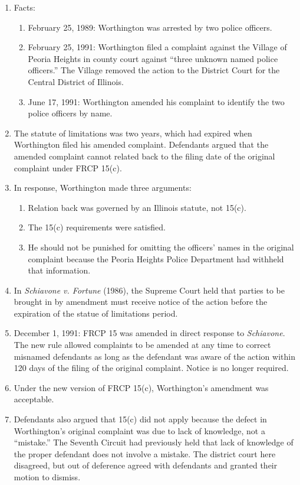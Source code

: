 \begin{enumerate}
    \item Facts:
    \begin{enumerate}
        \item February 25, 1989: Worthington was arrested by two police 
        officers.
        \item February 25, 1991: Worthington filed a complaint against the 
        Village of Peoria Heights in county court against ``three unknown 
        named police officers.'' The Village removed the action to the 
        District Court for the Central District of Illinois.
        \item June 17, 1991: Worthington amended his complaint to identify the 
        two police officers by name.
    \end{enumerate}
    \item The statute of limitations was two years, which had expired when 
    Worthington filed his amended complaint. Defendants argued that the 
    amended complaint cannot related back to the filing date of the original 
    complaint under FRCP 15(c).
    \item In response, Worthington made three arguments:
    \begin{enumerate}
        \item Relation back was governed by an Illinois statute, not 15(c).
        \item The 15(c) requirements were satisfied.
        \item He should not be punished for omitting the officers' names in 
        the original complaint because the Peoria Heights Police Department 
        had withheld that information.
    \end{enumerate}
    \item In \emph{Schiavone v. Fortune} (1986), the Supreme Court held that 
    parties to be brought in by amendment must receive notice of the action 
    before the expiration of the statue of limitations period.
    \item December 1, 1991: FRCP 15 was amended in direct response to 
    \emph{Schiavone}. The new rule allowed complaints to be amended at any 
    time to correct misnamed defendants as long as the defendant was aware of 
    the action within 120 days of the filing of the original complaint. Notice 
    is no longer required.
    \item Under the new version of FRCP 15(c), Worthington's amendment was 
    acceptable.
    \item Defendants also argued that 15(c) did not apply because the defect 
    in Worthington's original complaint was due to lack of knowledge, not a 
    ``mistake.'' The Seventh Circuit had previously held that lack of 
    knowledge of the proper defendant does not involve a mistake. The district 
    court here disagreed, but out of deference agreed with defendants and 
    granted their motion to dismiss.
\end{enumerate}

